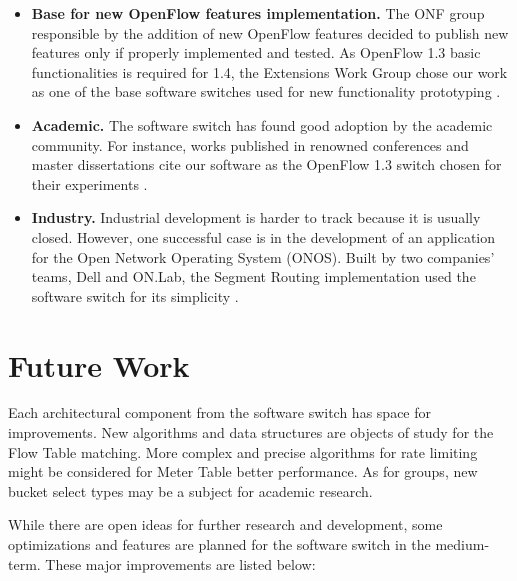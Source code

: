 \begin{itemize}
\item \textbf{Base for new OpenFlow features implementation.} The ONF group responsible by the addition of new OpenFlow features decided to publish new features only if properly implemented and tested. As OpenFlow 1.3 basic functionalities is required for 1.4, the Extensions Work Group chose our work as one of the base software switches used for new functionality prototyping \cite{ONFproto}. 

\item \textbf{Academic.} The software switch has found good adoption by the academic community. For instance, works published in renowned conferences \cite{Reitblatt:2013:FDF:2491185.2491187} \cite{Bianchi:2014:OPP:2602204.2602211} and master dissertations \cite{Paris} \cite{ShahmirShourmasti656472} cite our software as the OpenFlow 1.3 switch chosen for their experiments .  

\item \textbf{Industry.} Industrial development is harder to track because it is usually closed. However, one successful case is in the development of an application for the Open Network Operating System (ONOS). Built by two companies' teams, Dell and ON.Lab, the Segment Routing implementation used the software switch for its simplicity \cite{ONOS}.         
\end{itemize}

\section{Future Work}

Each architectural component from the software switch has space for improvements. New algorithms and data structures are objects of study for the Flow Table matching. More complex and precise algorithms for rate limiting might be considered for Meter Table better performance. As for groups, new bucket select types may be a subject for academic research. 

While there are open ideas for further research and development, some optimizations and features are planned for the software switch in the medium-term. These major improvements are listed below:

